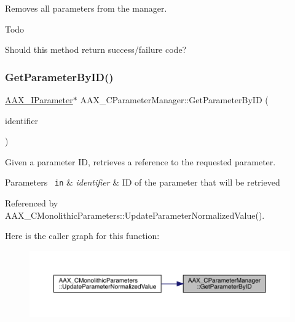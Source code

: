 Removes all parameters from the manager. 

\begin{DoxyRefDesc}{Todo}
\item[\mbox{\hyperlink{a00785__todo000020}{Todo}}]Should this method return success/failure code? \end{DoxyRefDesc}
\mbox{\label{a01545_a405918dfca50993f8c0b5259b3c5ee95}} 
\subsubsection{\texorpdfstring{GetParameterByID()}{GetParameterByID()}\hspace{0.1cm}{\footnotesize\ttfamily [1/2]}}
{\footnotesize\ttfamily \mbox{\hyperlink{a01857}{A\+A\+X\+\_\+\+I\+Parameter}}$\ast$ A\+A\+X\+\_\+\+C\+Parameter\+Manager\+::\+Get\+Parameter\+By\+ID (\begin{DoxyParamCaption}\item[{\mbox{\hyperlink{a00392_a1440c756fe5cb158b78193b2fc1780d1}{A\+A\+X\+\_\+\+C\+Param\+ID}}}]{identifier }\end{DoxyParamCaption})}



Given a parameter ID, retrieves a reference to the requested parameter. 


\begin{DoxyParams}[1]{Parameters}
\mbox{\texttt{ in}}  & {\em identifier} & ID of the parameter that will be retrieved \\
\hline
\end{DoxyParams}


Referenced by A\+A\+X\+\_\+\+C\+Monolithic\+Parameters\+::\+Update\+Parameter\+Normalized\+Value().

Here is the caller graph for this function\+:
\nopagebreak
\begin{figure}[H]
\begin{center}
\leavevmode
\includegraphics[width=350pt]{a01545_a405918dfca50993f8c0b5259b3c5ee95_icgraph}
\end{center}
\end{figure}
\mbox{\label{a01545_abeaa97c1e5de198f4c4bc53a3d45de62}} 
